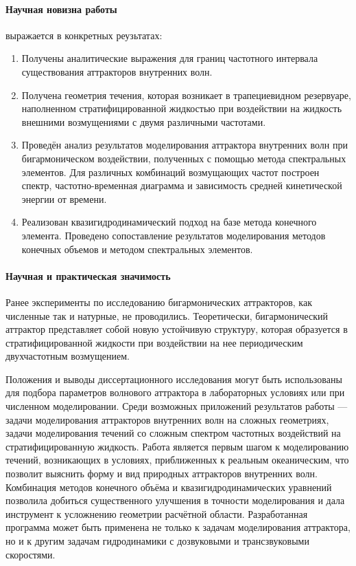 \documentclass[utf8x]{G7-32} %
\begin{document}
\paragraph{Научная новизна работы} выражается в конкретных реузьтатах:
\begin{enumerate}[1.]
  \item Получены аналитические выражения для границ частотного интервала существования аттракторов внутренних волн.%
    
  \item Получена геометрия течения, которая возникает в трапециевидном резервуаре, наполненном стратифицированной жидкостью при воздействии на жидкость внешними возмущениями с двумя различными частотами. 
    
  \item Проведён анализ результатов моделирования аттрактора внутренних волн при бигармоническом воздействии, полученных с помощью метода спектральных элементов. Для различных комбинаций возмущающих частот построен спектр, частотно-временная диаграмма и зависимость средней кинетической энергии от времени. 
    
  \item Реализован квазигидродинамический подход на базе метода конечного элемента. Проведено сопоставление результатов моделирования методов конечных объемов и методом спектральных элементов.
\end{enumerate}

\paragraph{Научная и практическая значимость} 

Ранее эксперименты по исследованию бигармонических аттракторов, как численные так и натурные, не проводились. Теоретически, бигармонический аттрактор представляет собой новую устойчивую структуру, которая образуется в стратифицированной жидкости при воздействии на нее периодическим двухчастотным возмущением.

Положения и выводы диссертационного исследования могут быть использованы для подбора параметров  волнового аттрактора в лабораторных условиях или при численном моделировании. Среди возможных приложений результатов работы — задачи моделирования аттракторов внутренних волн на сложных геометриях, задачи моделирования течений со сложным спектром частотных воздействий на стратифицированную жидкость. Работа является первым шагом к моделированию течений, возникающих в условиях, приближенных к реальным океаническим, что позволит выяснить форму и вид природных аттракторов внутренних волн. Комбинация методов конечного объёма и квазигидродинамических уравнений позволила добиться существенного улучшения в точности моделирования и дала инструмент к  усложнению геометрии расчётной области. Разработанная программа может быть применена не только к задачам моделирования аттрактора, но и к другим задачам гидродинамики с дозвуковыми и трансзвуковыми скоростями.
\end{document}
